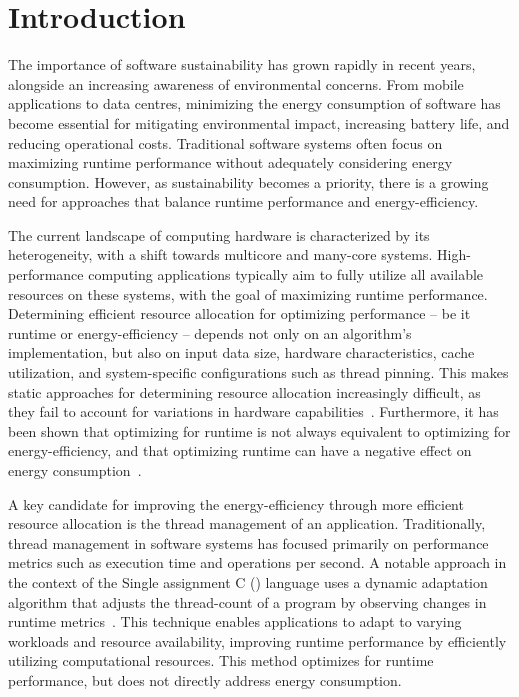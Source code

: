 
\section{Introduction}

The importance of software sustainability has grown rapidly in recent years, alongside an increasing
awareness of environmental concerns. From mobile applications to data centres, minimizing the energy
consumption of software has become essential for mitigating environmental impact, increasing battery
life, and reducing operational costs. Traditional software systems often focus on maximizing runtime
performance without adequately considering energy consumption. However, as sustainability becomes a
priority, there is a growing need for approaches that balance runtime performance and
energy-efficiency.

The current landscape of computing hardware is characterized by its heterogeneity, with a shift
towards multicore and many-core systems. High-perfor\-mance computing applications typically aim to
fully utilize all available resources on these systems, with the goal of maximizing runtime
performance. Determining efficient resource allocation for optimizing performance -- be it runtime
or energy-efficiency -- depends not only on an algorithm's implementation, but also on input data
size, hardware characteristics, cache utilization, and system-specific configurations such as thread
pinning. This makes static approaches for determining resource allocation increasingly difficult, as
they fail to account for variations in hardware capabilities~\cite{heterogeneous-systems}.
Furthermore, it has been shown that optimizing for runtime is not always equivalent to optimizing
for energy-efficiency, and that optimizing runtime can have a negative effect on energy
consumption~\cite{compiler-energy-android,compiler-energy-differences}.

A key candidate for improving the energy-efficiency through more efficient resource allocation is
the thread management of an application. Traditionally, thread management in software systems has
focused primarily on performance metrics such as execution time and operations per second. A notable
approach in the context of the Single assignment C (\sac{}) language uses a dynamic adaptation
algorithm that adjusts the thread-count of a program by observing changes in runtime
metrics~\cite{sac-mtdynamic}. This technique enables \sac{} applications to adapt to varying
workloads and resource availability, improving runtime performance by efficiently utilizing
computational resources. This method optimizes for runtime performance, but does not directly
address energy consumption.

